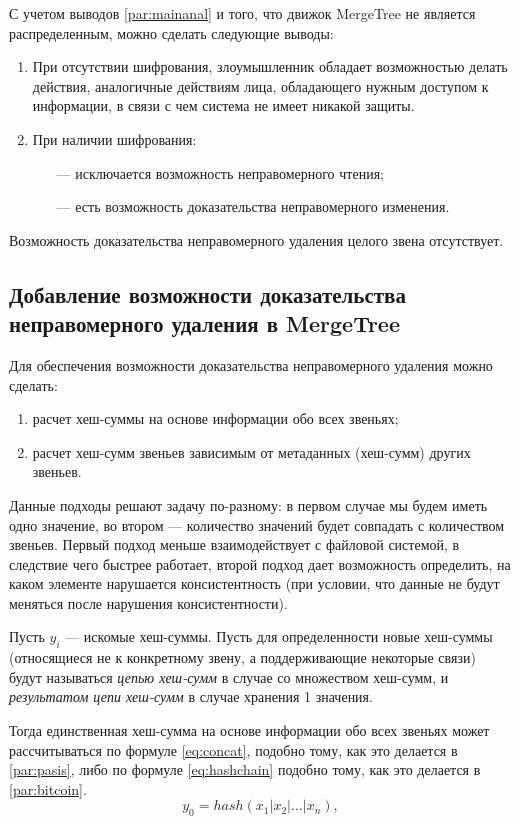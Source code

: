 С учетом выводов \ref{par:mainanal} и того, что движок MergeTree не является распределенным, можно сделать следующие выводы:
\begin{enumerate}
	\item При отсутствии шифрования, злоумышленник обладает возможностью делать действия, аналогичные действиям лица, обладающего нужным доступом к информации, в связи с чем система не имеет никакой защиты.
	\item При наличии шифрования:
	\begin{itemize}
		\item [---] исключается возможность неправомерного чтения;
		\item [---] есть возможность доказательства неправомерного изменения.
	\end{itemize}
\end{enumerate}

Возможность доказательства неправомерного удаления целого звена отсутствует.

\subsection{Добавление возможности доказательства неправомерного удаления в MergeTree}

Для обеспечения возможности доказательства неправомерного удаления можно сделать:
\begin{enumerate}
	\item расчет хеш-суммы на основе информации обо всех звеньях;
	\item расчет хеш-сумм звеньев зависимым от метаданных (хеш-сумм) других звеньев.
\end{enumerate}

Данные подходы решают задачу по-разному: в первом случае мы будем иметь одно значение, во втором --- количество значений будет совпадать с количеством звеньев. Первый подход меньше взаимодействует с файловой системой, в следствие чего быстрее работает, второй подход дает возможность определить, на каком элементе нарушается консистентность (при условии, что данные не будут меняться после нарушения консистентности).

Пусть $y_i$ --- искомые хеш-суммы. Пусть для определенности новые хеш-суммы (относящиеся не к конкретному звену, а поддерживающие некоторые связи) будут называться \textit{цепью хеш-сумм} в случае со множеством хеш-сумм, и \textit{результатом цепи хеш-сумм} в случае хранения 1 значения.

Тогда единственная хеш-сумма на основе информации обо всех звеньях может рассчитываться по формуле \ref{eq:concat}, подобно тому, как это делается в \ref{par:pasis}, либо по формуле \ref{eq:hashchain} подобно тому, как это делается в \ref{par:bitcoin}.
\begin{equation}
\label{eq:concat}
y_0 = hash(x_1 | x_2 | ... | x_n),
\end{equation}

